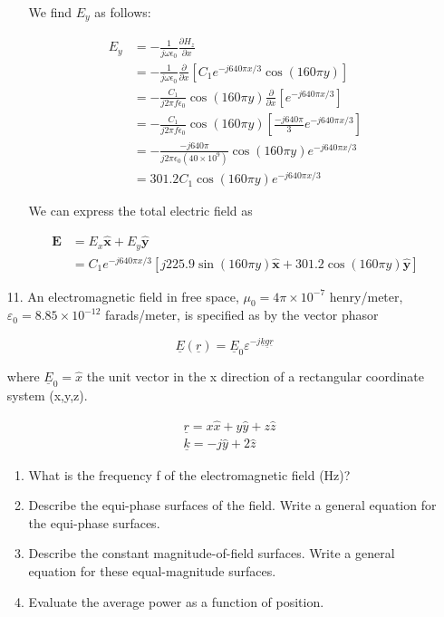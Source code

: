 \documentclass[main.tex]{subfiles}
\begin{document}
\begin{enumerate}
\begin{enumerate}
        We find $E_y$ as follows:
        
        $$
        \begin{aligned}
        E_y & =-\frac{1}{j \omega \epsilon_0} \frac{\partial H_z}{\partial x} \\
        & =-\frac{1}{j \omega \epsilon_0} \frac{\partial}{\partial x}\left[C_1 e^{-j 640 \pi x / 3} \cos (160 \pi y)\right] \\
        & =-\frac{C_1}{j 2 \pi f \epsilon_0} \cos (160 \pi y) \frac{\partial}{\partial x}\left[e^{-j 640 \pi x / 3}\right] \\
        & =-\frac{C_1}{j 2 \pi f \epsilon_0} \cos (160 \pi y)\left[\frac{-j 640 \pi}{3} e^{-j 640 \pi x / 3}\right] \\
        & =-\frac{-j 640 \pi}{j 2 \pi \epsilon_0\left(40 \times 10^9\right)} \cos (160 \pi y) e^{-j 640 \pi x / 3} \\
        & =301.2 C_1 \cos (160 \pi y) e^{-j 640 \pi x / 3}
        \end{aligned}
        $$

        We can express the total electric field as
        
        $$
        \begin{aligned}
        \mathbf{E} & =E_x \hat{\mathbf{x}}+E_y \hat{\mathbf{y}} \\
        & =C_1 e^{-j 640 \pi x / 3}[j 225.9 \sin (160 \pi y) \hat{\mathbf{x}}+301.2 \cos (160 \pi y) \hat{\mathbf{y}}]
        \end{aligned}
        $$
        
    \end{enumerate}
    
\item [11.] An electromagnetic field in free space, $\mu_{0}=4 \pi \times 10^{-7}$ henry/meter, $\varepsilon_0 = 8.85 \times 10^{-12}$ farads/meter, is specified as by the vector phasor 

$$\underline{E}(\underline{r})=\underline{E}_{0} \varepsilon^{-j \underline{k} \underline{g} \underline{r}}$$

where $\underline{E}_{0}=\hat{x}$ the unit vector in the x direction of a rectangular coordinate system (x,y,z).

$$\begin{aligned}
&\underline{r}=x \hat{x}+y \hat{y}+z \hat{z} \\
&\underline{k}=-j \hat{y}+2 \hat{z}
\end{aligned}$$

    \begin{enumerate}
        \item What is the frequency f of the electromagnetic field (Hz)?
        \item Describe the equi-phase surfaces of the field. Write a general equation for the equi-phase surfaces.
        \item Describe the constant magnitude-of-field surfaces. Write a general equation for these equal-magnitude surfaces.
        \item Evaluate the average power as a function of position.
    \end{enumerate}


\end{enumerate}
\end{document}
